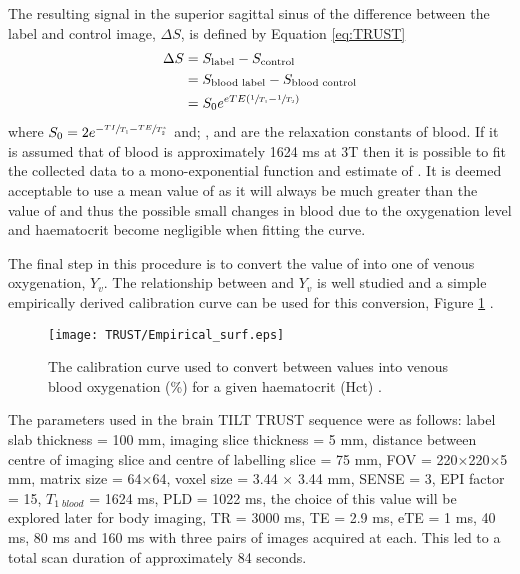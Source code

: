 The resulting signal in the superior sagittal sinus of the difference between the label and control image, $\Delta S$, is defined by Equation \eqref{eq:TRUST}
\begin{align}
\Delta S&=S_{\text{label}}-S_{\text{control}}\nonumber\\
&=S_{\text{blood label}}-S_{\text{blood control}}\nonumber\\
&=S_0e^{eTE\left(\sfrac{1}{T_1}-\sfrac{1}{T_2}\right)}
\label{eq:TRUST}
\end{align}  
where $S_0=2e^{-\sfrac{TI}{T_1}-\sfrac{TE}{T_2^*}}$ and; \tone, \ttwo and \ttwostar are the relaxation constants of blood. If it is assumed that \tone of blood is approximately 1624 ms at 3T \cite{lu_determining_2004} then it is possible to fit the collected data to a mono-exponential function and estimate of \ttwo. It is deemed acceptable to use a mean value of \tone as it will always be much greater than the value of \ttwo and thus the possible small changes in blood \tone due to the oxygenation level and haematocrit become negligible when fitting the \ttwo curve.

The final step in this procedure is to convert the value of \ttwo into one of venous oxygenation, $Y_v$. The relationship between \ttwo and $Y_v$ is well studied and a simple empirically derived calibration curve can be used for this conversion, Figure \ref{fig:calibration_curve} \cite{gardener_dependence_2010, silvennoinen_comparison_2003, liu_t1_2016}.

\begin{figure}[H]
	\centering
	\texttt{[image: TRUST/Empirical\_surf.eps]}
	\caption{The calibration curve used to convert between \ttwo values into venous blood oxygenation (\%) for a given haematocrit (Hct) \cite{lu_calibration_2012}.}
	\label{fig:calibration_curve}	
\end{figure}

The parameters used in the brain \ac{TILT} \ac{TRUST} sequence were as follows: label slab thickness = 100 mm, imaging slice thickness = 5 mm, distance between centre of imaging slice and centre of labelling slice = 75 mm, \ac{FOV} = 220$\times$220$\times$5 mm, matrix size = 64$\times$64, voxel size = 3.44 $\times$ 3.44 mm, \ac{SENSE} = 3, \ac{EPI} factor = 15, $T_{1\;blood}$ = 1624 ms, \ac{PLD} = 1022 ms, the choice of this value will be explored later for body imaging, \ac{TR} = 3000 ms, \ac{TE} = 2.9 ms, \ac{eTE} = 1 ms, 40 ms, 80 ms and 160 ms with three pairs of images acquired at each. This led to a total scan duration of approximately 84 seconds.

